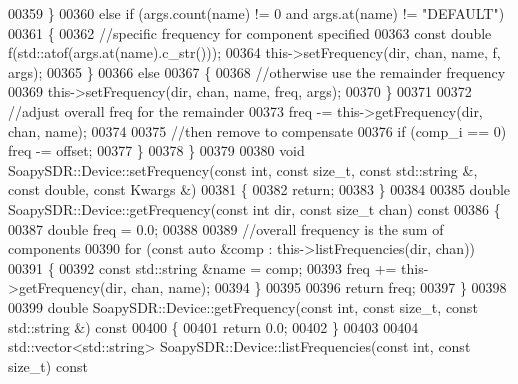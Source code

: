 \begin{DoxyCode}
00359         \}
00360         \textcolor{keywordflow}{else} \textcolor{keywordflow}{if} (args.count(name) != 0 and args.at(name) != \textcolor{stringliteral}{"DEFAULT"})
00361         \{
00362             \textcolor{comment}{//specific frequency for component specified}
00363             \textcolor{keyword}{const} \textcolor{keywordtype}{double} f(std::atof(args.at(name).c\_str()));
00364             this->setFrequency(dir, chan, name, f, args);
00365         \}
00366         \textcolor{keywordflow}{else}
00367         \{
00368             \textcolor{comment}{//otherwise use the remainder frequency}
00369             this->setFrequency(dir, chan, name, freq, args);
00370         \}
00371 
00372         \textcolor{comment}{//adjust overall freq for the remainder}
00373         freq -= this->getFrequency(dir, chan, name);
00374 
00375         \textcolor{comment}{//then remove to compensate}
00376         \textcolor{keywordflow}{if} (comp\_i == 0) freq -= offset;
00377     \}
00378 \}
00379 
00380 \textcolor{keywordtype}{void} SoapySDR::Device::setFrequency(\textcolor{keyword}{const} \textcolor{keywordtype}{int}, \textcolor{keyword}{const} \textcolor{keywordtype}{size\_t}, \textcolor{keyword}{const} std::string &, \textcolor{keyword}{const} \textcolor{keywordtype}{double}, \textcolor{keyword}{const} 
      Kwargs &)
00381 \{
00382     \textcolor{keywordflow}{return};
00383 \}
00384 
00385 \textcolor{keywordtype}{double} SoapySDR::Device::getFrequency(\textcolor{keyword}{const} \textcolor{keywordtype}{int} dir, \textcolor{keyword}{const} \textcolor{keywordtype}{size\_t} chan)\textcolor{keyword}{ const}
00386 \textcolor{keyword}{}\{
00387     \textcolor{keywordtype}{double} freq = 0.0;
00388 
00389     \textcolor{comment}{//overall frequency is the sum of components}
00390     \textcolor{keywordflow}{for} (\textcolor{keyword}{const} \textcolor{keyword}{auto} &comp : this->listFrequencies(dir, chan))
00391     \{
00392         \textcolor{keyword}{const} std::string &name = comp;
00393         freq += this->getFrequency(dir, chan, name);
00394     \}
00395 
00396     \textcolor{keywordflow}{return} freq;
00397 \}
00398 
00399 \textcolor{keywordtype}{double} SoapySDR::Device::getFrequency(\textcolor{keyword}{const} \textcolor{keywordtype}{int}, \textcolor{keyword}{const} \textcolor{keywordtype}{size\_t}, \textcolor{keyword}{const} std::string &)\textcolor{keyword}{ const}
00400 \textcolor{keyword}{}\{
00401     \textcolor{keywordflow}{return} 0.0;
00402 \}
00403 
00404 std::vector<std::string> SoapySDR::Device::listFrequencies(\textcolor{keyword}{const} \textcolor{keywordtype}{int}, \textcolor{keyword}{const} \textcolor{keywordtype}{size\_t})\textcolor{keyword}{ const}

\end{DoxyCode}
